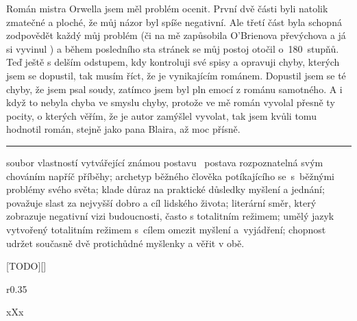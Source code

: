 \documentclass{extarticle} %
\begin{document}
\noindent 
Román mistra Orwella jsem měl problém ocenit.
První dvě části byli natolik zmatečné a ploché, že můj názor byl spíše negativní.
Ale třetí část byla schopná zodpovědět každý můj problém (či na mě zapůsobila O’Brienova převýchova a já si vyvinul )
a během posledního sta stránek se můj postoj otočil o~180~stupňů. \\
Teď ještě s delším odstupem, kdy kontroluji své spisy a opravuji chyby, kterých jsem se dopustil,
tak musím říct, že je  vynikajícím románem.
Dopustil jsem se té chyby, že jsem psal soudy, zatímco jsem byl pln emocí z románu samotného.
A i když to nebyla chyba ve smyslu chyby, protože ve mě román vyvolal přesně ty pocity,
o kterých věřím, že je autor zamýšlel vyvolat,
tak jsem kvůli tomu hodnotil román, stejně jako pana Blaira, až moc přísně.



\vfill

\noindent\begin{minipage}{\textwidth}
	{\textcolor{\wpagecolor}{\rule{\linewidth}{0.4pt}}
		\footnotesize
		 soubor vlastností vytvářející známou postavu
		\textbfhl{$\Rightarrow$}~postava rozpoznatelná svým chováním napříč příběhy;
		 archetyp běžného člověka potíkajícího se~s~běžnými problémy svého světa;
		 klade důraz na praktické důsledky myšlení a jednání;
		 považuje slast za nejvyšší dobro a cíl lidského života;
		 literární směr, který zobrazuje negativní vizi budoucnosti, často s totalitním režimem;
		 umělý jazyk vytvořený totalitním režimem s~cílem omezit myšlení a~vyjádření;
		 chopnost udržet současně dvě protichůdné myšlenky a věřit v obě.
	}
\end{minipage}

\newpage


\changefontsize{8pt}

[TODO][\killpage]

\noindent\begin{wrapfigure}{r}{0.35\textwidth}
\tiny

\setlength{\parindent}{3pt}
xXx
\end{wrapfigure}

\end{document}
